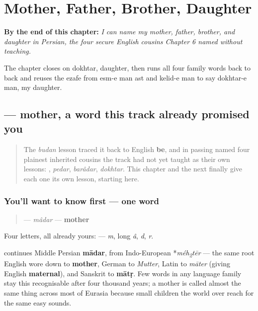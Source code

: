 
\chapter{Mother, Father, Brother, Daughter}
\label{ch:fa-family}

\begin{chapteropening}
\textbf{By the end of this chapter:} \emph{I can name my mother, father, brother, and daughter in Persian, the four secure English cousins Chapter 6 named without teaching.}

The chapter closes on dokhtar, daughter, then runs all four family words back to back and reuses the ezafe from esm-e man ast and kelid-e man to say dokhtar-e man, my daughter.
\end{chapteropening}

\section[\texorpdfstring{\fa{مادر} (mâdar)}{مادر (mâdar)}]{ — mother, a word this track already promised you}

\label{lesson:FA-C10-madar}



\begin{quote}
The \emph{budan} lesson traced it back to English \textbf{be}, and in passing named four plainest inherited cousins the track had not yet taught as their own lessons: \textbf{}, \emph{pedar}, \emph{barâdar}, \emph{dokhtar}. This chapter and the next finally give each one its own lesson, starting here.
\end{quote}

\subsection*{You'll want to know first — one word}
\begin{quote}
\textbf{} — \emph{mâdar} — \textbf{mother}
\end{quote}

Four letters, all already yours: \textbf{   } — \emph{m}, long \emph{â}, \emph{d}, \emph{r}.

\begin{cousinweb}
\textbf{} continues Middle Persian \textbf{mādar}, from Indo-European *\emph{méh\textsubscript{2}tēr} — the same root English wore down to \textbf{mother}, German to \emph{Mutter}, Latin to \emph{māter} (giving English \textbf{maternal}), and Sanskrit to \textbf{mātṛ}. Few words in any language family stay this recognisable after four thousand years; a mother is called almost the same thing across most of Eurasia because small children the world over reach for the same easy sounds.
\end{cousinweb}


